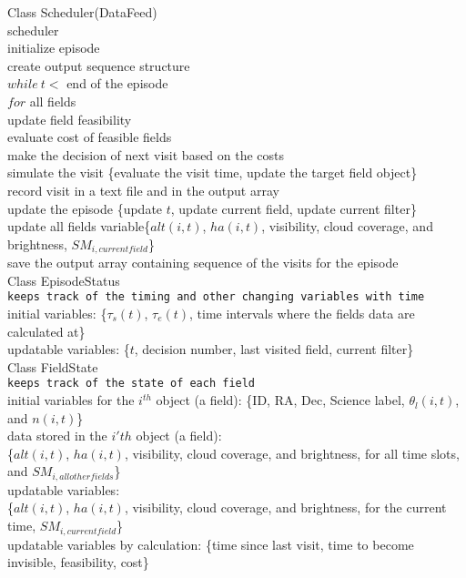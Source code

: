 \documentclass[]{spie}  %
\theoremstyle{definition}
\begin{document}
\noindent Class Scheduler(DataFeed)\\
\indent scheduler\\
\indent \indent initialize episode\\
\indent \indent create output sequence structure\\
\indent \indent $while~ t <$ end of the episode\\
\indent \indent \indent $for$ all fields\\
\indent \indent \indent \indent update field feasibility\\
\indent \indent \indent \indent evaluate cost of feasible fields\\
\indent \indent \indent make the decision of next visit based on the costs\\
\indent \indent \indent simulate the visit \{evaluate the visit time, update the target field object\}\\
\indent \indent \indent record visit in a text file and in the output array\\
\indent \indent \indent update the episode \{update $t$, update current field, update current filter\}\\
\indent \indent \indent update all fields variable\{$alt(i,t)$, $ha(i,t)$, visibility, cloud coverage, and brightness, $SM_{i,current field}$\}\\
\indent \indent save the output array containing sequence of the visits for the episode\\


\noindent Class EpisodeStatus\\
\noindent \texttt{keeps track of the timing and other changing variables with time}\\
\indent initial variables: \{$\tau_s(t)$, $\tau_e(t)$, time intervals where the fields data are calculated at\}\\
\indent updatable variables: \{$t$, decision number, last visited field, current filter\}\\


\noindent Class FieldState\\
\noindent \texttt{keeps track of the state of each field}\\
\indent initial variables for the $i^{th}$ object (a field): \{ID, RA, Dec, Science label, $\theta_{l}(i,t)$, and $n(i,t)$\}\\
\indent data stored in the $i'th$ object (a field):\\
\indent \{$alt(i,t)$, $ha(i,t)$, visibility, cloud coverage, and brightness, for all time slots, and $SM_{i, all other fields}$\}\\
\indent updatable variables:\\
\indent \{$alt(i,t)$, $ha(i,t)$, visibility, cloud coverage, and brightness, for the current time, $SM_{i,current field}$\}\\
\indent updatable variables by calculation: \{time since last visit, time to become invisible, feasibility, cost\}
\end{document}
